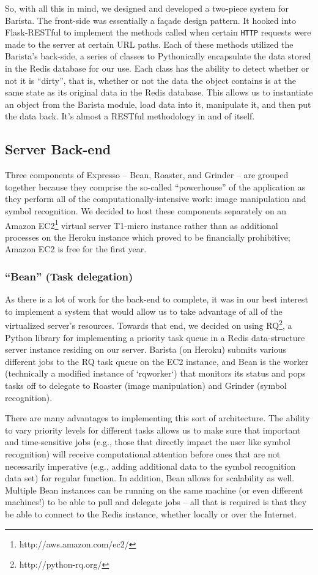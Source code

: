 \documentclass{acm_proc_article-sp}
\begin{document}
So, with all this in mind, we designed and developed a two-piece system for Barista. The front-side was essentially a fa\c{c}ade design pattern. It hooked into Flask-RESTful to implement the methods called when certain \texttt{HTTP} requests were made to the server at certain URL paths. Each of these methods utilized the Barista's back-side, a series of classes to Pythonically encapsulate the data stored in the Redis database for our use. Each class has the ability to detect whether or not it is ``dirty'', that is, whether or not the data the object contains is at the same state as its original data in the Redis database. This allows us to instantiate an object from the Barista module, load data into it, manipulate it, and then put the data back. It's almost a RESTful methodology in and of itself.

\subsection{Server Back-end}
Three components of Expresso -- Bean, Roaster, and Grinder -- are grouped together because they comprise the so-called ``powerhouse'' of the application as they perform all of the computationally-intensive work: image manipulation and symbol recognition. We decided to host these components separately on an Amazon EC2\footnote{http://aws.amazon.com/ec2/} virtual server T1-micro instance rather than as  additional processes on the Heroku instance which proved to be financially prohibitive; Amazon EC2 is free for the first year. 

\subsubsection{``Bean'' (Task delegation)}
As there is a lot of work for the back-end to complete, it was in our best interest to
implement a system that would allow us to take advantage of all of the virtualized server's resources. Towards that end, we decided on using RQ\footnote{http://python-rq.org/}, a Python library for implementing a priority task queue in a Redis data-structure server instance residing on our server. Barista (on Heroku) submits various different jobs to the RQ task queue on the EC2 instance, and Bean is the worker (technically a modified instance of `rqworker`) that monitors its status and pops tasks off to delegate to Roaster (image manipulation) and Grinder (symbol recognition).

There are many advantages to implementing this sort of architecture. The ability to vary priority levels for different tasks allows us to make sure that important and time-sensitive jobs (e.g., those that directly impact the user like symbol recognition) will receive computational attention before ones that are not necessarily imperative (e.g., adding additional data to the symbol recognition data set) for regular function. In addition, Bean allows for scalability as well. Multiple Bean instances can be running on the same machine (or even different machines!) to be able to pull and delegate jobs -- all that is required is that they be able to connect to the Redis instance, whether locally or over the Internet.
\end{document}

